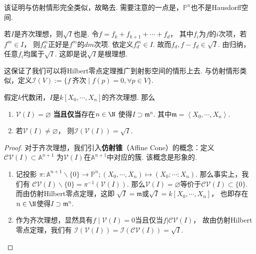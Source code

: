     该证明与仿射情形完全类似，故略去. 需要注意的一点是，$\mathbb{P}^{n}$也不是Hausdorff空间.

    \begin{remark}
        若$I$是齐次理想，则$\sqrt{I}$也是. 令$f=f_{k}+f_{k+1}+\cdots+f_{d}$，
        其中$f_{i}$为$f$的$i$次项，若$f^{m} \in I$，
        则$f_{d}^{m}$正好是$f^{m}$的$dm$次项. 依定义$f_{d}^{m} \in I$. 
        故而$f_{d},f-f_{d} \in \sqrt{I}$. 由归纳，任意$f_{i}$均属于$\sqrt{I}$. 
        这即是说$\sqrt{I}$是根理想.
    \end{remark}

    这保证了我们可以将Hilbert零点定理推广到射影空间的情形上去. 
    与仿射情形类似，定义$\mathcal{I}(V):=\{f\ 齐次\mid f(p)=0,\forall p \in V \}$.

    \begin{theorem}[射影Hilbert零点定理]
        假定$k$代数闭，$I$是$k[X_{0},\cdots,X_{n}]$的齐次理想. 那么
        \begin{enumerate}
            \item[(1)] $\mathcal{V}(I)=\varnothing$
                       \textbf{当且仅当}存在$n \in \N$
                       使得$I \supset \mathfrak{m}^{n}$.
                       其中$\mathfrak{m}=\left<X_{0},\cdots,X_{n}\right>$. 
            \item[(2)] 若$\mathcal{V}(I)\neq\varnothing$，
                       则$\mathcal{I}(\mathcal{V}(I))=\sqrt{I}$.
        \end{enumerate}
    \end{theorem}
    \begin{proof}
        对于齐次理想，我们引入\textbf{仿射锥}（Affine Cone）的概念：定义$\mathcal{CV}(I) \subset \mathbb{A}^{n+1}$
        为$\mathcal{V}(I)$在$\mathbb{A}^{n+1}$中对应的簇. 该概念是形象的.
        \begin{enumerate}
            \item[(1)] 记投影
                       $\pi\colon\mathbb{A}^{n+1}\backslash\{0\} \rightarrow \mathbb{P}^{n};
                       (X_{0},\cdots,X_{n}) \mapsto (X_{0}:\cdots:X_{n})$.
                       那么事实上，我们有
                       $\mathcal{CV}(I)\backslash\{0\} = \pi^{-1}(\mathcal{V}(I))$.
                       那么$\mathcal{V}(I) = \varnothing$等价于$\mathcal{CV}(I) \subset \{0\}$.
                       而由仿射Hilbert零点定理，这即
                       $\sqrt{I}=\mathfrak{m}$或$\sqrt{I}=k[X_{0},\cdots,X_{n}]$，
                       也即存在$n \in \N$使得$I \supset \mathfrak{m}^{n}$.
            \item[(2)] 作为齐次理想，显然具有$f\mid\mathcal{V}(I)=0$当且仅当$f|\mathcal{CV}(I)$，
                       故由仿射Hilbert零点定理，我们有
                       $\mathcal{I}(\mathcal{V}(I))=\mathcal{I}(\mathcal{CV}(I))=\sqrt{I}$.\qedhere
        \end{enumerate}
    \end{proof}

